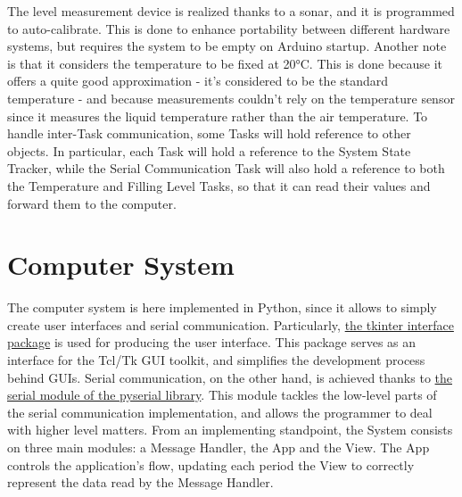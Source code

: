 \documentclass[a4paper,12pt]{report}
\begin{document}
	\newline The level measurement device is realized thanks to a sonar, and it is programmed to auto-calibrate. This is done to enhance portability between different hardware systems, but requires the system to be empty on Arduino startup. Another note is that it considers the temperature to be fixed at 20°C. This is done because it offers a quite good approximation - it's considered to be the standard temperature - and because measurements couldn't rely on the temperature sensor since it measures the liquid temperature rather than the air temperature.
	\newline To handle inter-Task communication, some Tasks will hold reference to other objects. In particular, each Task will hold a reference to the System State Tracker, while the Serial Communication Task will also hold a reference to both the Temperature and Filling Level Tasks, so that it can read their values and forward them to the computer.
	
	\section{Computer System}
	The computer system is here implemented in Python, since it allows to simply create user interfaces and serial communication.\newline
	Particularly, \href{https://docs.python.org/3/library/tkinter.html}{the tkinter interface package} is used for producing the user interface. This package serves as an interface for the Tcl/Tk GUI toolkit, and simplifies the development process behind GUIs.\newline
	Serial communication, on the other hand, is achieved thanks to \href{https://pyserial.readthedocs.io/en/latest/}{the serial module of the pyserial library}. This module tackles the low-level parts of the serial communication implementation, and allows the programmer to deal with higher level matters.\newline
	From an implementing standpoint, the System consists on three main modules: a Message Handler, the App and the View. The App controls the application's flow, updating each period the View to correctly represent the data read by the Message Handler.
\end{document}

